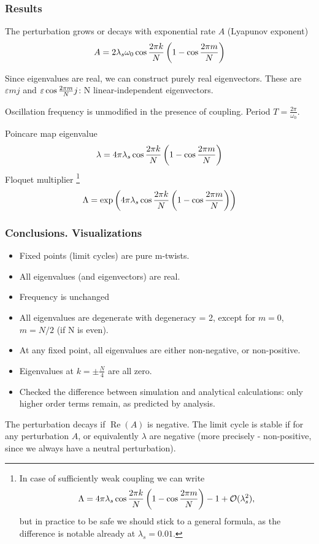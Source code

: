\documentclass[a4paper,12pt]{article}
\renewcommand{\Re}{\operatorname{Re}}
\newcommand{\eps}{\varepsilon}
\newcommand{\bigO}{\mathcal{O}}
\begin{document}
\subsubsection{Results}

The perturbation grows or decays with exponential rate $A$ (Lyapunov exponent)
$$
A = 2 \lambda_s \omega_0 \cos \frac{2 \pi k} {N}  \left(1 - \cos \frac{2 \pi m} {N}  \right)
$$

Since eigenvalues are real, we can construct purely real eigenvectors. These are $\eps \si{m}{j}$ and  $\eps \co{m}{j}$: N linear-independent eigenvectors.

Oscillation frequency is unmodified in the presence of coupling. Period $T = \frac{2 \pi}{\omega_0}$.


Poincare map eigenvalue
$$
\lambda = 4 \pi \lambda_s  \cos \frac{2 \pi k} {N}  \left(1 - \cos \frac{2 \pi m} {N}  \right)
$$
Floquet multiplier 
\footnote{
In case of sufficiently weak coupling we can write
$$
\Lambda 
= 4 \pi \lambda_s  \co{k}{} \left(1 - \co{m}{} \right) - 1  + \bigO(\lambda_s^2),
$$
but in practice to be safe we should stick to a general formula, as the difference is notable already at $\lambda_s = 0.01$.
}
$$
\Lambda = \exp \left( 4  \pi \lambda_s  \cos \frac{2 \pi k} {N}  \left(1 - \cos \frac{2 \pi m} {N}  \right) \right)
$$



\subsubsection{Conclusions. Visualizations}
\begin{itemize}
\item Fixed points (limit cycles) are pure m-twists.
\item All eigenvalues (and eigenvectors) are real.
\item Frequency is unchanged
\item All eigenvalues are degenerate with degeneracy = 2, except for $m=0$, $m=N / 2$ (if N is even).
\item At any fixed point, all eigenvalues are either non-negative, or non-positive.
\item Eigenvalues at $k=\pm\frac{N}{4}$  are all zero.
\item Checked the difference between simulation and analytical calculations: only higher order terms remain, as predicted by analysis.

\end{itemize}

The perturbation decays if $\Re(A)$ is negative. The limit cycle is stable if for any perturbation $A$, or equivalently $\lambda$ are negative (more precisely - non-positive, since we always have a neutral perturbation).
\end{document}
